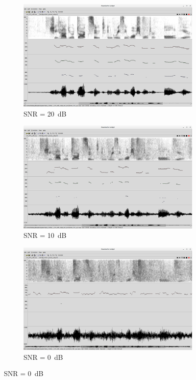 \documentclass[11pt,a4paper,titlepage]{article}
\begin{document}
\begin{figure}[htbp]
  \centering
  \begin{subfigure}{0.7\textwidth}
    \includegraphics[width=\textwidth]{snr_20dB.png}
    \caption{SNR = \SI{20}{dB}}
    \label{fig:snr-compare-20db}
  \end{subfigure}

  \begin{subfigure}{0.7\textwidth}
    \includegraphics[width=\textwidth]{snr_10dB.png}
    \caption{SNR = \SI{10}{dB}}
    \label{fig:snr-compare-10db}
  \end{subfigure}

  \begin{subfigure}{0.7\textwidth}
    \includegraphics[width=\textwidth]{snr_0dB.png}
    \caption{SNR = \SI{0}{dB}}
    \label{fig:snr-compare-0db}
  \end{subfigure}


\end{figure}
\end{document}
